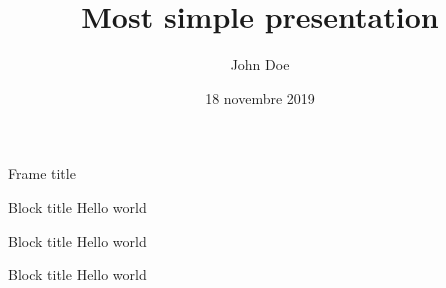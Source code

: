 \documentclass[aspectratio=169]{beamer}
\title{Most simple presentation}
\author{John Doe}
\institute{ENSTA Bretagne}
\date{18 novembre 2019}
\begin{document}
{
	\begin{frame}[plain]
	\maketitle
	\end{frame}
}


\begin{frame}{Frame title}
\begin{exampleblock}{Block title}
Hello world
\end{exampleblock}
\begin{block}{Block title}
Hello world %
\end{block}
\begin{alertblock}{Block title}
Hello world \cite{Feynman1941}
\end{alertblock}
\end{frame}
\begin{frame}
\printbibliography
\end{frame}
\end{document}
